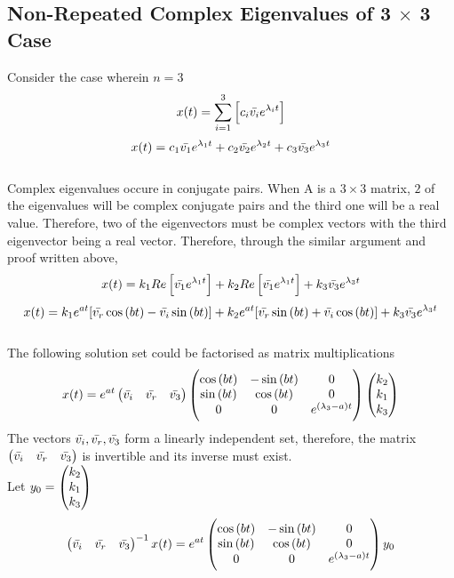 \documentclass[a4paper, 12pt]{report}
\begin{document}
\begin{center}
\section{Non-Repeated Complex Eigenvalues of 3 $\times$ 3 Case}
\begin{comment}
\end{comment}
Consider the case wherein $n = 3$
$$x(t) = \sum_{i=1}^{3}\left[c_i\bar{v_i}e^{\lambda_i t}\right]$$
$$x(t) = c_1\bar{v_1}e^{\lambda_1 t} + c_2\bar{v_2}e^{\lambda_2 t} + c_3\bar{v_3}e^{\lambda_3 t}$$
\\Complex eigenvalues occure in conjugate pairs. When A is a $3 \times 3$ matrix, $2$ of the eigenvalues will be complex conjugate pairs and the third one will be a real value. Therefore, two of the eigenvectors must be complex vectors with the third eigenvector being a real vector. Therefore, through the similar argument and proof written above, 
$$x(t) = k_1Re\left[\bar{v_1}e^{\lambda_1 t}\right] + k_2Re\left[\bar{v_1}e^{\lambda_1 t}\right] + k_3\bar{v_3}e^{\lambda_3 t}$$
$$x(t)=k_1e^{at}[\bar{v_r}\cos{(bt)} - \bar{v_i}\sin{(bt)}] + k_2e^{at}[\bar{v_r}\sin{(bt)} + \bar{v_i}\cos{(bt)}] + k_3\bar{v_3}e^{\lambda_3 t}$$
\\The following solution set could be factorised as matrix multiplications
$$x(t) = e^{at} \begin{pmatrix} \bar{v_i}&\bar{v_r} &\bar{v_3} \end{pmatrix} \begin{pmatrix}\cos{(bt)} &-\sin{(bt)} &0\\\sin{(bt)}&\cos{(bt)} & 0\\0& 0& e^{(\lambda_3 - a)t}\end{pmatrix} \begin{pmatrix} k_2 \\k_1 \\ k_3 \end{pmatrix}$$
The vectors $\bar{v_i},\bar{v_r},\bar{v_3}$ form a linearly independent set, therefore, the matrix $\displaystyle{\begin{pmatrix} \bar{v_i}&\bar{v_r} &\bar{v_3} \end{pmatrix}}$ is invertible and its inverse must exist.
\\Let $\displaystyle{y_0 = \begin{pmatrix} k_2\\k_1 \\k_3 \end{pmatrix}}$ 
$$\begin{pmatrix} \bar{v_i}&\bar{v_r} &\bar{v_3} \end{pmatrix} ^{-1 }x(t) = e^{at} \begin{pmatrix}\cos{(bt)} &-\sin{(bt)} &0\\\sin{(bt)}&\cos{(bt)} & 0\\0& 0& e^{(\lambda_3 - a)t}\end{pmatrix} y_0$$

\end{center}
\end{document}
